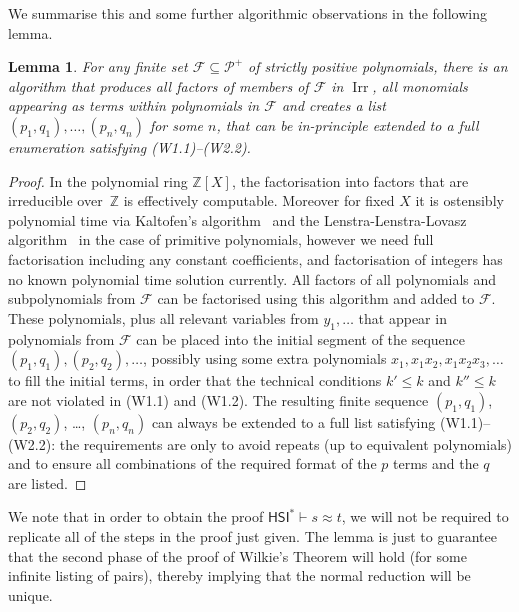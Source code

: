 \documentclass[eqnor,reqno]{amsart}
\theoremstyle{plain}
\newtheorem{lem}[thm]{Lemma}
\theoremstyle{definition}
\newcommand{\Irr}{\operatorname{Irr}}
\newcommand{\up}[1]{\textup{#1}}
\newcommand{\HSI}{\textsf{HSI}}
\begin{document}
We summarise this and some further algorithmic observations in the following lemma.
\begin{lem}\label{lem:listextend}
For any finite set $\mathcal{F}\subseteq\mathcal{P}^+$ of strictly positive polynomials, there is an algorithm that produces all factors of members of $\mathcal{F}$ in $\Irr$, all monomials appearing as terms within polynomials in $\mathcal{F}$ and creates a list $(p_1,q_1),\dots,(p_n,q_n)$ for some $n$, that can be in-principle extended to a full enumeration satisfying \up(W1.1\up)--\up(W2.2\up).
\end{lem}
\begin{proof}
In the polynomial ring $\mathbb{Z}[X]$, the factorisation into  factors that are irreducible over~$\mathbb{Z}$ is effectively computable.  Moreover for fixed $X$ it is ostensibly polynomial time via Kaltofen's algorithm~\cite{kal} and the Lenstra-Lenstra-Lovasz algorithm~\cite{LLL} in the case of primitive polynomials, however we need full factorisation including any constant coefficients, and factorisation of integers has no known polynomial time solution currently.  
All factors of all polynomials and subpolynomials from $\mathcal{F}$ can be factorised using this algorithm and added to $\mathcal{F}$.  
These polynomials, plus all relevant variables from $y_1,\dots$ that appear in polynomials from $\mathcal{F}$ can be placed into the initial segment of the sequence $(p_1,q_1),(p_2,q_2),\dots$, possibly using some extra polynomials $x_1,x_1x_2,x_1x_2x_3,\dots$ to fill the initial terms, in order that the technical conditions $k'\leq k$ and $k''\leq k$ are not violated in (W1.1) and (W1.2).  
The resulting  finite sequence $(p_1,q_1)$, $(p_2,q_2)$, \dots, $(p_n,q_n)$ can always be extended to a full list satisfying (W1.1)--(W2.2):  the requirements are only to avoid repeats (up to equivalent polynomials) and to ensure all combinations of the required format of the $p$ terms and the $q$ are listed.  
\end{proof}
We note that in order to obtain the proof $\HSI^*\vdash s\approx t$,  we will not be required to replicate all of the steps in the proof just given.  The lemma is just to guarantee that the second phase of the proof of Wilkie's Theorem will hold (for some infinite listing of pairs), thereby implying that the normal reduction will be unique.
\end{document}
